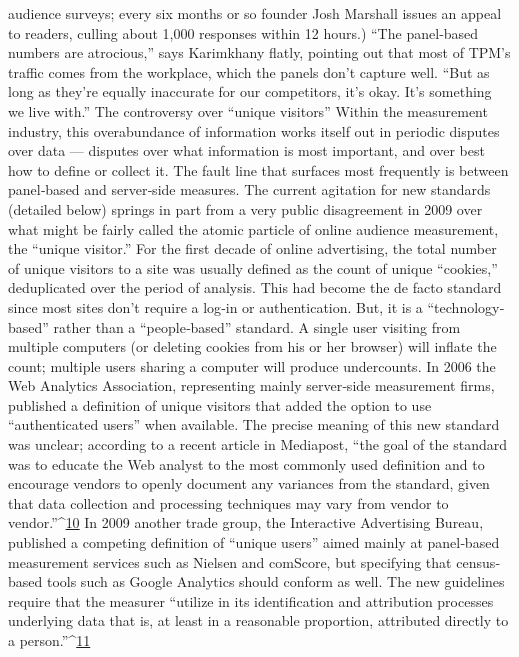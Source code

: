 audience surveys; every six months or so founder Josh Marshall issues an
appeal to readers, culling about 1,000 responses within 12 hours.)
``The panel‐based numbers are atrocious,'' says Karimkhany flatly,
pointing out that most of TPM’s traffic comes from the workplace, which
the panels don’t capture well. ``But as long as they’re equally inaccurate
for our competitors, it’s okay. It’s something we live with.''
The controversy over ``unique visitors''
Within the measurement industry, this overabundance of information
works itself out in periodic disputes over data — disputes over what
information is most important, and over best how to define or collect it.
The fault line that surfaces most frequently is between panel‐based and
server‐side measures. The current agitation for new standards (detailed
below) springs in part from a very public disagreement in 2009 over what
might be fairly called the atomic particle of online audience measurement,
the ``unique visitor.''
For the first decade of online advertising, the total number of unique
visitors to a site was usually defined as the count of unique ``cookies,'' deduplicated
over the period of analysis. This had become the de facto
standard since most sites don’t require a log‐in or authentication. But, it is
a ``technology‐based'' rather than a ``people‐based'' standard. A single
user visiting from multiple computers (or deleting cookies from his or her
browser) will inflate the count; multiple users sharing a computer will
produce undercounts.
In 2006 the Web Analytics Association, representing mainly server‐side
measurement firms, published a definition of unique visitors that added
the option to use ``authenticated users'' when available. The precise
meaning of this new standard was unclear; according to a recent article in
Mediapost, ``the goal of the standard was to educate the Web analyst to the
most commonly used definition and to encourage vendors to openly
document any variances from the standard, given that data collection and
processing techniques may vary from vendor to vendor.''^{\href{#endnotes}{10}}
In 2009 another trade group, the Interactive Advertising Bureau,
published a competing definition of ``unique users'' aimed mainly at
panel‐based measurement services such as Nielsen and comScore, but
specifying that census‐based tools such as Google Analytics should
conform as well. The new guidelines require that the measurer ``utilize in
its identification and attribution processes underlying data that is, at least
in a reasonable proportion, attributed directly to a person.''^{\href{#endnotes}{11}}
